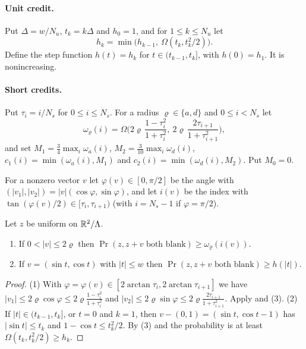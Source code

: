 \documentclass[11pt,colorlinks]{charlie}
\begin{document}
\paragraph{Unit credit.} Put $\Delta=w/N_u$, $t_k=k\Delta$ and $h_0=1$, and for $1\le k\le N_u$ let
\[
 h_k=\min\big(h_{k-1},\ \Omega(t_k,t_k^2/2)\big).
\]
Define the step function $h(t)=h_k$ for $t\in(t_{k-1},t_k]$, with $h(0)=h_1$. It is nonincreasing.
\paragraph{Short credits.} Put $\tau_i=i/N_s$ for $0\le i\le N_s$. For a radius $\varrho\in\{a,d\}$ and $0\le i<N_s$ let
\[
 \omega_\varrho(i)=\Omega\Big(2\varrho\,\frac{1-\tau_i^2}{1+\tau_i^2},\ 2\varrho\,\frac{2\tau_{i+1}}{1+\tau_{i+1}^2}\Big),
\]
and set $M_1=\tfrac34\max_i\omega_a(i)$, $M_2=\tfrac3{10}\max_i\omega_d(i)$, $c_1(i)=\min(\omega_a(i),M_1)$ and $c_2(i)=\min(\omega_d(i),M_2)$. Put $M_0=0$.

For a nonzero vector $v$ let $\varphi(v)\in[0,\pi/2]$ be the angle with $(|v_1|,|v_2|)=|v|(\cos\varphi,\sin\varphi)$, and let $i(v)$ be the index with $\tan(\varphi(v)/2)\in[\tau_i,\tau_{i+1})$ (with $i=N_s-1$ if $\varphi=\pi/2$).

\begin{lemma}\label{lem:credits-valid}
Let $z$ be uniform on $\mathbb{R}^2/\Lambda$.
\begin{enumerate}
\item If $0<|v|\le2\varrho$ then $\Pr(z,z+v\text{ both blank})\ge\omega_\varrho(i(v))$.
\item If $v=(\sin t,\cos t)$ with $|t|\le w$ then $\Pr(z,z+v\text{ both blank})\ge h(|t|)$.
\end{enumerate}
\end{lemma}
\begin{proof}
(1) With $\varphi=\varphi(v)\in[2\arctan\tau_i,2\arctan\tau_{i+1}]$ we have $|v_1|\le2\varrho\cos\varphi\le2\varrho\frac{1-\tau_i^2}{1+\tau_i^2}$ and $|v_2|\le2\varrho\sin\varphi\le2\varrho\frac{2\tau_{i+1}}{1+\tau_{i+1}^2}$. Apply  and (3).
(2) If $|t|\in(t_{k-1},t_k]$, or $t=0$ and $k=1$, then $v-(0,1)=(\sin t,\cos t-1)$ has $|\sin t|\le t_k$ and $1-\cos t\le t_k^2/2$. By (3) and  the probability is at least $\Omega(t_k,t_k^2/2)\ge h_k$.
\end{proof}
\end{document}
